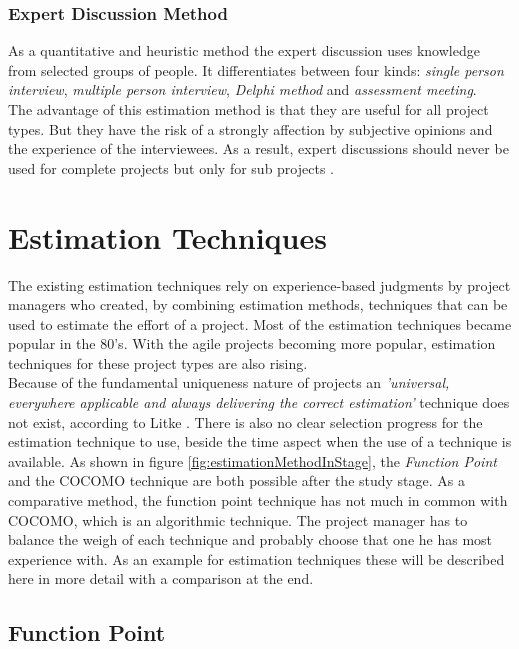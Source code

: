 \subsubsection{Expert Discussion Method}

As a quantitative and heuristic method the expert discussion uses knowledge from selected groups of people. It differentiates between four kinds: \textit{single person interview}, \textit{multiple person interview}, \textit{Delphi method} and \textit{assessment meeting}.\\
The advantage of this estimation method is that they are useful for all project types. But they have the risk of a strongly affection by subjective opinions and the experience of the interviewees. As a result, expert discussions should never be used for complete projects but only for sub projects \cite{itplanung}.\\

\section{Estimation Techniques}

The existing estimation techniques rely on experience-based judgments by project managers
who created, by combining estimation methods, techniques that can be used to estimate the effort of a project. Most of the estimation techniques became popular in the 80's. With the agile projects becoming more popular, estimation techniques for these project types are also rising. \\
Because of the fundamental uniqueness nature of projects an \textit{'universal, everywhere applicable and always delivering the correct estimation'} technique does not exist, according to Litke \cite{litke}. There is also no clear selection progress for the estimation technique to use, beside the time aspect when the use of a technique is available. As shown in figure \ref{fig:estimationMethodInStage}, the \textit{Function Point} and the COCOMO technique are both possible after the study stage. As a comparative method, the function point technique has not much in common with COCOMO, which is an algorithmic technique. The project manager has to balance the weigh of each technique and probably choose that one he has most experience with. As an example for estimation techniques these will be described here in more detail with a comparison at the end.


\subsection{Function Point} \label{FPMethod}

